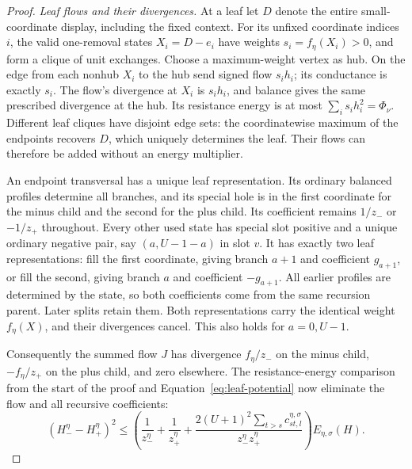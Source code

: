 \begin{proof}
\emph{Leaf flows and their divergences.}
At a leaf let $D$ denote the entire small-coordinate display, including
the fixed context. For its unfixed coordinate indices $i$, the valid
one-removal states $X_i=D-e_i$ have
weights $s_i=f_\eta(X_i)>0$, and form a clique of unit exchanges.
Choose a maximum-weight vertex as hub.  On the edge from each nonhub
$X_i$ to the hub send signed flow $s_i h_i$; its conductance is exactly
$s_i$.  The flow's divergence at $X_i$ is $s_i h_i$, and balance gives
the same prescribed divergence at the hub.  Its resistance energy is
at most $\sum_i s_i h_i^2=\Phi_\nu$.
Different leaf cliques have disjoint edge sets: the coordinatewise
maximum of the endpoints recovers $D$, which uniquely determines the
leaf.  Their flows can therefore be added without an energy multiplier.

An endpoint transversal has a unique leaf representation.  Its ordinary
balanced profiles determine all branches, and its special hole is in
the first coordinate for the minus child and the second for the plus
child.  Its coefficient remains $1/z_-$ or $-1/z_+$ throughout.
Every other used state has special slot positive and a unique ordinary
negative pair, say $(a,U-1-a)$ in slot $v$.  It has exactly two leaf
representations: fill the first coordinate, giving branch $a+1$ and
coefficient $g_{a+1}$, or fill the second, giving branch $a$ and
coefficient $-g_{a+1}$.  All earlier profiles are determined by the state,
so both coefficients come from the same recursion parent.  Later splits
retain them.  Both representations carry the identical weight
$f_\eta(X)$, and their divergences cancel.  This also holds for
$a=0,U-1$.

Consequently the summed flow $J$ has divergence $f_\eta/z_-$ on the
minus child, $-f_\eta/z_+$ on the plus child, and zero elsewhere.
The resistance-energy comparison from the start of the proof and
Equation~\eqref{eq:leaf-potential} now eliminate the flow and all
recursive coefficients:
\begin{equation}\label{eq:soft-transport}
 (H_-^\eta-H_+^\eta)^2
 \le\left(\frac1{z_-^\eta}+\frac1{z_+^\eta}
       +\frac{2(U+1)^2\sum_{t>s}c_{st,l}^{\eta,\sigma}}
                    {z_-^\eta z_+^\eta}\right)E_{\eta,\sigma}(H).
\end{equation}


\end{proof}
